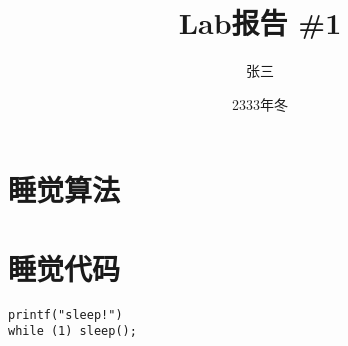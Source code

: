 \documentclass{article}
\title{\bfseries Lab报告 \#1}
\author{张三 \quad 2332332333}
\date{2333年冬}
\begin{document}
    \maketitle
    \pagestyle{plain}
    \tableofcontents

    \section{睡觉算法}
    \begin{algorithm}[H]
    \end{algorithm}

    \section{睡觉代码}
    \begin{center}
        \begin{lstlisting}
printf("sleep!")
while (1) sleep();
        \end{lstlisting}
    \end{center}
\end{document}
